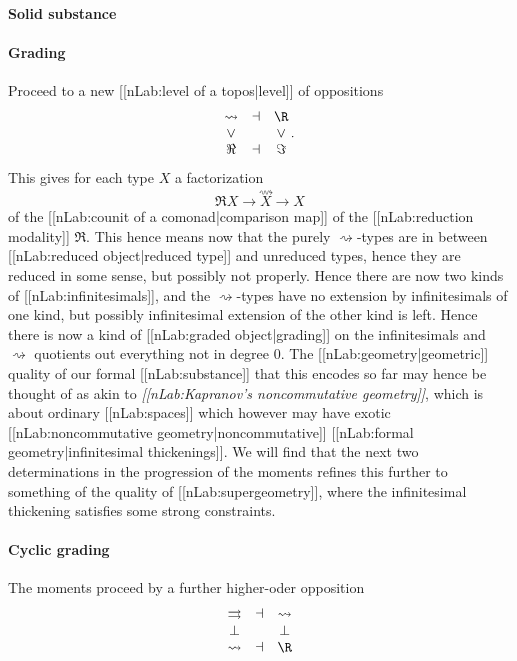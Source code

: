 \documentclass[12pt,titlepage]{article}
\newcommand{\itexarray}[1]{\begin{matrix}#1\end{matrix}}
\theoremstyle{plain}
\theoremstyle{definition}
\theoremstyle{remark}
\begin{document}
\hypertarget{solid_substance}{}\paragraph*{{Solid substance}}\label{solid_substance}
\hypertarget{Grading}{}\paragraph*{{Grading}}\label{Grading}
Proceed to a new [[nLab:level of a topos|level]] of oppositions
\begin{displaymath}
\itexarray{
    \rightsquigarrow &\dashv& \R
    \\
    \vee && \vee
    \\
    \Re &\dashv& \Im
  }
  \,.
\end{displaymath}
This gives for each type $X$ a factorization
\begin{displaymath}
\Re X \longrightarrow \stackrel{\rightsquigarrow}{X} \longrightarrow X
\end{displaymath}
of the [[nLab:counit of a comonad|comparison map]] of the [[nLab:reduction modality]] $\Re$.
This hence means now that the purely $\rightsquigarrow$-types are in between [[nLab:reduced object|reduced type]] and unreduced types, hence they are reduced in some sense, but possibly not properly. Hence there are now two kinds of [[nLab:infinitesimals]], and the $\rightsquigarrow$-types have no extension by infinitesimals of one kind, but possibly infinitesimal extension of the other kind is left.
Hence there is now a kind of [[nLab:graded object|grading]] on the infinitesimals and $\rightsquigarrow$ quotients out everything not in degree 0.
The [[nLab:geometry|geometric]] quality of our formal [[nLab:substance]] that this encodes so far may hence be thought of as akin to \emph{[[nLab:Kapranov's noncommutative geometry]]}, which is about ordinary [[nLab:spaces]] which however may have exotic [[nLab:noncommutative geometry|noncommutative]] [[nLab:formal geometry|infinitesimal thickenings]]. We will find that the next two determinations in the progression of the moments refines this further to something of the quality of [[nLab:supergeometry]], where the infinitesimal thickening satisfies some strong constraints.
\hypertarget{cyclic_grading}{}\paragraph*{{Cyclic grading}}\label{cyclic_grading}
The moments proceed by a further higher-oder opposition
\begin{displaymath}
\itexarray{
    \rightrightarrows &\dashv& \rightsquigarrow
    \\
    \bot && \bot
    \\
    \rightsquigarrow &\dashv& \R
  }
\end{displaymath}
\end{document}
